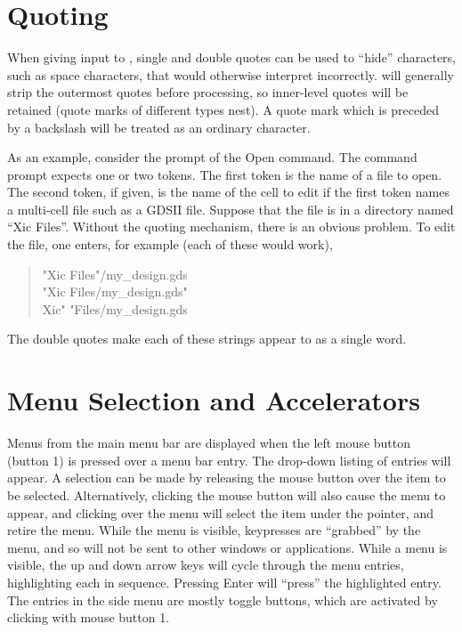 \section{Quoting}

When giving input to {\Xic}, single and double quotes can be used to
``hide'' characters, such as space characters, that {\Xic} would
otherwise interpret incorrectly.  {\Xic} will generally strip the
outermost quotes before processing, so inner-level quotes will be
retained (quote marks of different types nest).  A quote mark which is
preceded by a backslash will be treated as an ordinary character.

As an example, consider the prompt of the {\cb Open} command.  The
command prompt expects one or two tokens.  The first token is the name
of a file to open.  The second token, if given, is the name of the
cell to edit if the first token names a multi-cell file such as a
GDSII file.  Suppose that the file is in a directory named ``{\vt Xic
Files}''.  Without the quoting mechanism, there is an obvious problem. 
To edit the file, one enters, for example (each of these would work),

\begin{quote}\vt
"Xic Files"/my\_design.gds\\
"Xic Files/my\_design.gds"\\
Xic" "Files/my\_design.gds
\end{quote}

The double quotes make each of these strings appear to {\Xic} as a
single word.


\section{Menu Selection and Accelerators}

Menus from the main menu bar are displayed when the left mouse button
(button 1) is pressed over a menu bar entry.  The drop-down listing of
entries will appear.  A selection can be made by releasing the mouse
button over the item to be selected.  Alternatively, clicking the
mouse button will also cause the menu to appear, and clicking over the
menu will select the item under the pointer, and retire the menu. 
While the menu is visible, keypresses are ``grabbed'' by the menu, and
so will not be sent to other windows or applications.  While a menu is
visible, the up and down arrow keys will cycle through the menu
entries, highlighting each in sequence.  Pressing {\kb Enter} will
``press'' the highlighted entry.  The entries in the side menu are
mostly toggle buttons, which are activated by clicking with mouse
button 1.

